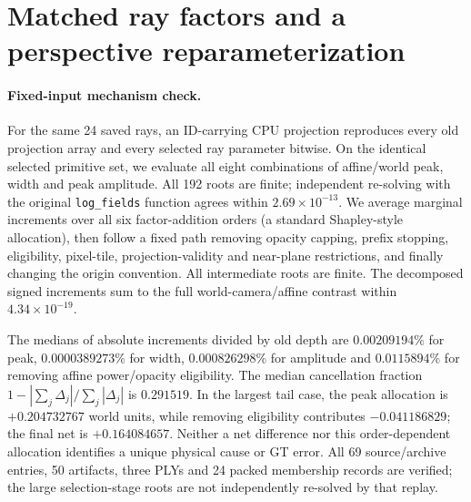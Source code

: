 \documentclass[11pt,a4paper]{article}
\begin{document}
\section{Matched ray factors and a perspective reparameterization}

\paragraph{Fixed-input mechanism check.}
For the same 24 saved rays, an ID-carrying CPU projection reproduces
every old projection array and every selected ray parameter bitwise.
On the identical selected primitive set, we evaluate all eight
combinations of affine/world peak, width and peak amplitude. All
192 roots are finite; independent re-solving with the original
\texttt{log\_fields} function agrees within $2.69\times10^{-13}$.
We average marginal increments over all six factor-addition orders
(a standard Shapley-style allocation), then follow a fixed path
removing opacity capping, prefix stopping, eligibility, pixel-tile,
projection-validity and near-plane restrictions, and finally changing
the origin convention. All intermediate roots are finite. The
decomposed signed increments sum to the full world-camera/affine
contrast within $4.34\times10^{-19}$.

The medians of absolute increments divided by old depth are
$0.00209194\%$ for peak, $0.0000389273\%$ for width,
$0.000826298\%$ for amplitude and $0.0115894\%$ for removing
affine power/opacity eligibility. The median cancellation fraction
$1-|\sum_j\Delta_j|/\sum_j|\Delta_j|$ is $0.291519$.
In the largest tail case, the peak allocation is $+0.204732767$
world units, while removing eligibility contributes $-0.041186829$;
the final net is $+0.164084657$. Neither a net difference nor this
order-dependent allocation identifies a unique physical cause or GT
error. All 69 source/archive entries, 50 artifacts, three PLYs and
24 packed membership records are verified; the large selection-stage
roots are not independently re-solved by that replay.
\end{document}
